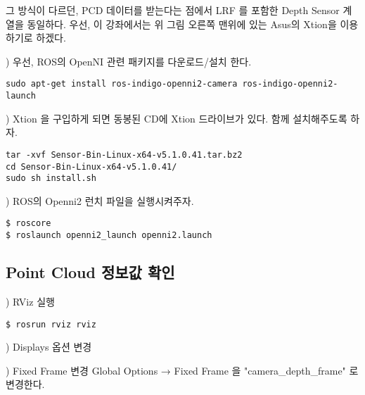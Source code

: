 그 방식이 다르던, PCD 데이터를 받는다는 점에서 LRF 를 포함한 Depth Sensor 계열을 동일하다. 우선, 이 강좌에서는 위 그림 오른쪽 맨위에 있는 Asus의 Xtion을 이용하기로 하겠다. 

\setcounter{num}{0}

\vspace{\baselineskip}
\noindent
{}
\thenum) 우선, ROS의 OpenNI 관련 패키지를 다운로드/설치 한다.

\begin{lstlisting}[language=ROS]
sudo apt-get install ros-indigo-openni2-camera ros-indigo-openni2-launch
\end{lstlisting}

\vspace{\baselineskip}
\noindent
{}
\thenum) Xtion 을 구입하게 되면 동봉된 CD에 Xtion 드라이브가 있다. 함께 설치해주도록 하자.

\begin{lstlisting}[language=ROS]
tar -xvf Sensor-Bin-Linux-x64-v5.1.0.41.tar.bz2
cd Sensor-Bin-Linux-x64-v5.1.0.41/
sudo sh install.sh 
\end{lstlisting}

\vspace{\baselineskip}
\noindent
{}
\thenum) ROS의 Openni2 런치 파일을 실행시켜주자.

\begin{lstlisting}[language=ROS]
$ roscore
$ roslaunch openni2_launch openni2.launch
\end{lstlisting}

\subsection{Point Cloud 정보값 확인}

\setcounter{num}{0}

\thenum) RViz 실행

\begin{lstlisting}[language=ROS]
$ rosrun rviz rviz
\end{lstlisting}

\vspace{\baselineskip}
\noindent
{}
\thenum) Displays 옵션 변경

\vspace{\baselineskip}
\noindent
{}) Fixed Frame 변경
Global Options → Fixed Frame 을 "camera\_depth\_frame" 로 변경한다.

